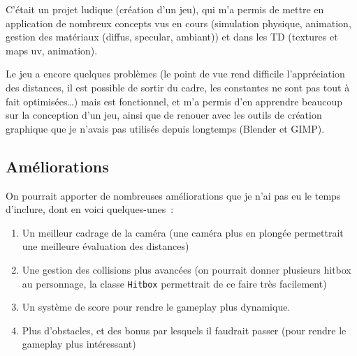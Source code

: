 \documentclass[a4paper,12pt]{article}
\begin{document}
C’était un projet ludique (création d’un jeu), qui m’a permis de mettre en application de nombreux concepts vus en cours (simulation physique, animation, gestion des matériaux (diffus, specular, ambiant)) 
et dans les TD (textures et maps uv, animation).

Le jeu a encore quelques problèmes (le point de vue rend difficile l’appréciation des distances, il est possible de sortir du cadre, les constantes ne sont pas tout à fait optimisées…) mais est fonctionnel, 
et m’a permis d’en apprendre beaucoup sur la conception d’un jeu, ainsi que de renouer avec les outils de 
création graphique que je n’avais pas utilisés depuis longtemps (Blender et GIMP).

\subsection{Améliorations}
On pourrait apporter de nombreuses améliorations que je n’ai pas eu le temps d’inclure, dont en voici quelques-unes :
\begin{enumerate}
    \item Un meilleur cadrage de la caméra (une caméra plus en plongée permettrait une meilleure évaluation des distances)
    \item Une gestion des collisions plus avancées (on pourrait donner plusieurs hitbox au personnage, la classe \verb|Hitbox| permettrait de ce faire très facilement)
    \item Un système de score pour rendre le gameplay plus dynamique.
    \item Plus d’obstacles, et des bonus par lesquels il faudrait passer (pour rendre le gameplay plus intéressant)
\end{enumerate}
\end{document}
